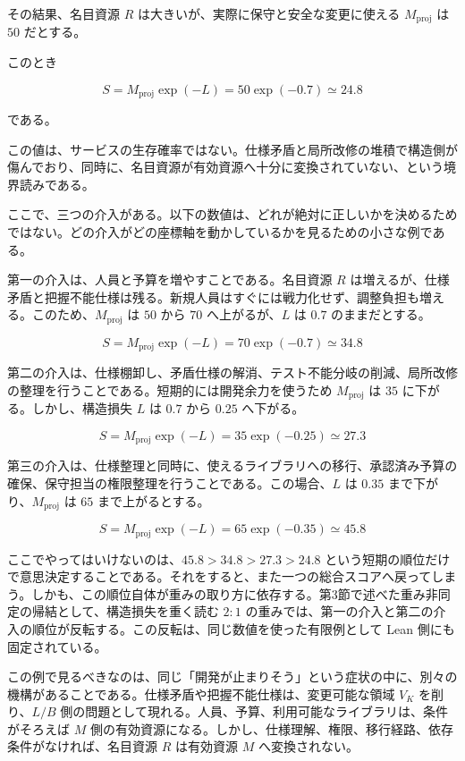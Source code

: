 \documentclass[12pt,a4paper]{article}
\begin{document}
その結果、名目資源 \(R\) は大きいが、実際に保守と安全な変更に使える \(M_{\mathrm{proj}}\) は \(50\) だとする。

このとき

\[
S=M_{\mathrm{proj}}\exp(-L)=50\exp(-0.7)\simeq 24.8
\]

である。

この値は、サービスの生存確率ではない。仕様矛盾と局所改修の堆積で構造側が傷んでおり、同時に、名目資源が有効資源へ十分に変換されていない、という境界読みである。

ここで、三つの介入がある。以下の数値は、どれが絶対に正しいかを決めるためではない。どの介入がどの座標軸を動かしているかを見るための小さな例である。

第一の介入は、人員と予算を増やすことである。名目資源 \(R\) は増えるが、仕様矛盾と把握不能仕様は残る。新規人員はすぐには戦力化せず、調整負担も増える。このため、\(M_{\mathrm{proj}}\) は \(50\) から \(70\) へ上がるが、\(L\) は \(0.7\) のままだとする。

\[
S=M_{\mathrm{proj}}\exp(-L)=70\exp(-0.7)\simeq 34.8
\]

第二の介入は、仕様棚卸し、矛盾仕様の解消、テスト不能分岐の削減、局所改修の整理を行うことである。短期的には開発余力を使うため \(M_{\mathrm{proj}}\) は \(35\) に下がる。しかし、構造損失 \(L\) は \(0.7\) から \(0.25\) へ下がる。

\[
S=M_{\mathrm{proj}}\exp(-L)=35\exp(-0.25)\simeq 27.3
\]

第三の介入は、仕様整理と同時に、使えるライブラリへの移行、承認済み予算の確保、保守担当の権限整理を行うことである。この場合、\(L\) は \(0.35\) まで下がり、\(M_{\mathrm{proj}}\) は \(65\) まで上がるとする。

\[
S=M_{\mathrm{proj}}\exp(-L)=65\exp(-0.35)\simeq 45.8
\]

ここでやってはいけないのは、\(45.8>34.8>27.3>24.8\) という短期の順位だけで意思決定することである。それをすると、また一つの総合スコアへ戻ってしまう。しかも、この順位自体が重みの取り方に依存する。第3節で述べた重み非同定の帰結として、構造損失を重く読む \(2:1\) の重みでは、第一の介入と第二の介入の順位が反転する。この反転は、同じ数値を使った有限例として Lean 側にも固定されている。

この例で見るべきなのは、同じ「開発が止まりそう」という症状の中に、別々の機構があることである。仕様矛盾や把握不能仕様は、変更可能な領域 \(V_K\) を削り、\(L/B\) 側の問題として現れる。人員、予算、利用可能なライブラリは、条件がそろえば \(M\) 側の有効資源になる。しかし、仕様理解、権限、移行経路、依存条件がなければ、名目資源 \(R\) は有効資源 \(M\) へ変換されない。
\end{document}
